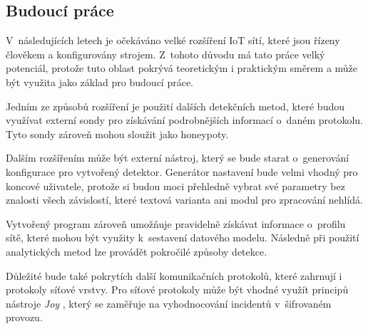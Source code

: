 \documentclass[thesis=M,czech]{FITthesis}[2012/06/26]
\begin{document}
\begin{conclusion}
\section{Budoucí práce}
V~následujících letech je očekáváno velké rozšíření IoT sítí, které jsou řízeny člověkem a 
konfigurovány strojem. Z~tohoto důvodu má tato práce velký potenciál, protože tuto oblast pokrývá
teoretickým i praktickým směrem a může být využita jako základ pro budoucí práce. 

Jedním ze způsobů
rozšíření je použití dalších detekčních metod, které budou využívat externí sondy pro získávání
podrobnějších informací o~daném protokolu. Tyto sondy zároveň mohou sloužit jako honeypoty.

Dalším rozšířením může být externí nástroj, který se bude starat o~generování konfigurace pro 
vytvořený detektor. Generátor nastavení bude velmi vhodný pro koncové uživatele, protože si budou
moci přehledně vybrat své parametry bez znalosti všech závislostí, které textová varianta ani 
modul pro zpracování nehlídá. 

Vytvořený program zároveň umožňuje pravidelně 
získávat informace o~profilu sítě, které mohou být využity k~sestavení datového modelu. 
Následně při použití
analytických metod lze provádět pokročilé způsoby detekce.

Důležité bude také pokrytích další komunikačních protokolů, které zahrnují i protokoly síťové 
vrstvy. Pro síťové protokoly může být vhodné využít principů nástroje \textit{Joy} \cite{joy}, 
který se zaměřuje 
na vyhodnocování incidentů v~šifrovaném provozu.
\end{conclusion}




\appendix
\end{document}
